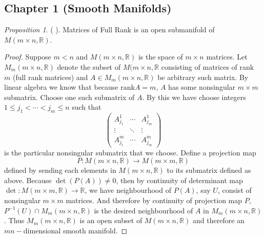 \documentclass[a4paper]{article}
\theoremstyle{remark}
\newtheorem{prop}{Proposition}
\begin{document}
\subsection{Chapter 1 (Smooth Manifolds)}
\begin{prop}
( \cite{LeeSM}). Matrices of Full Rank is an open submanifold of $M(m\times n,\mathbb{R})$.  
\end{prop}
\begin{proof}
Suppose $m <n$ and $M(m\times n, \mathbb{R})$ is the space of $m \times n$ matrices. Let $M_m(m\times n, \mathbb{R})$ denote the subset of $M(m\times n, \mathbb{R}$ consisting of matrices of rank $m$ (full rank matrices) and  $A \in M_m(m\times n, \mathbb{R})$ be arbitrary such matrix. By linear algebra we know that because $\text{rank} A = m$, $A$ has some nonsingular $m\times m$ submatrix. Choose one such submatrix of $A$. By this we have choose integers $1\leq j_1 < \cdots < j_m \leq n$ such that 
$$
\begin{pmatrix}
A^1_{j_1} & \cdots & A^1_{j_m} \\
\vdots & \ddots & \vdots \\
A^m_{j_1} & \cdots & A^m_{j_m}
\end{pmatrix}
$$
is the particular nonsingular submatrix that we choose. Define a projection map 
$$
P : M(m\times n, \mathbb{R}) \rightarrow M(m\times m, \mathbb{R})
$$
defined by sending each elements in $ M(m\times n, \mathbb{R})$ to its submatrix defined as above. Because $\det(P(A))\neq 0$, then by continuity of determinant map $\det  :  M(m\times m, \mathbb{R})  \rightarrow \mathbb{R}$, we have neighbourhood of $P(A)$, say $U$, consist of nonsingular $m \times m$ matrices. And therefore by continuity of projection map $P$, $P^{-1}(U) \cap M_m(m\times n, \mathbb{R}) $ is the desired neighbourhood of $A$ in $M_m(m\times n, \mathbb{R})$. Thus $M_m(m\times n, \mathbb{R})$ is an open subset of $M(m\times n, \mathbb{R})$ and therefore an $mn-$dimensional smooth manifold.
\end{proof}
\end{document}
